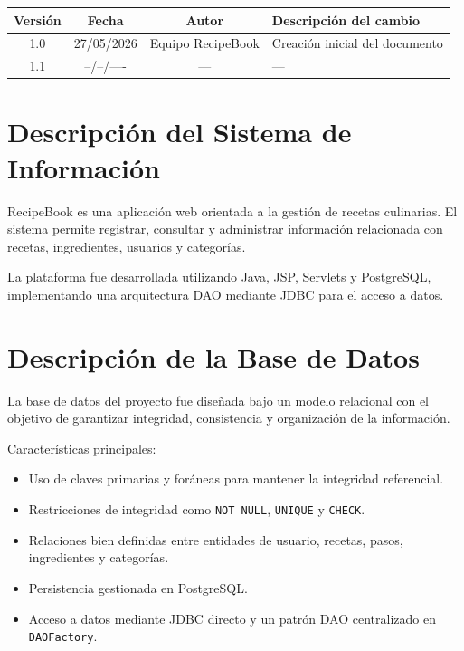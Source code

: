 \documentclass[12pt,a4paper]{article}
\begin{document}
\begin{table}[H]
\centering
\begin{tabular}{|c|c|c|p{6cm}|}
\hline
\textbf{Versión} & \textbf{Fecha} & \textbf{Autor} & \textbf{Descripción del cambio} \\
\hline
1.0 & 27/05/2026 & Equipo RecipeBook & Creación inicial del documento \\
\hline
1.1 & --/--/---- & --- & --- \\
\hline
\end{tabular}
\end{table}

\vspace{1cm}

\tableofcontents
\newpage

\section{Descripción del Sistema de Información}

RecipeBook es una aplicación web orientada a la gestión de recetas culinarias. El sistema permite registrar, consultar y administrar información relacionada con recetas, ingredientes, usuarios y categorías.

La plataforma fue desarrollada utilizando Java, JSP, Servlets y PostgreSQL, implementando una arquitectura DAO mediante JDBC para el acceso a datos.

\section{Descripción de la Base de Datos}

La base de datos del proyecto fue diseñada bajo un modelo relacional con el objetivo de garantizar integridad, consistencia y organización de la información.

Características principales:

\begin{itemize}
    \item Uso de claves primarias y foráneas para mantener la integridad referencial.
    \item Restricciones de integridad como \texttt{NOT NULL}, \texttt{UNIQUE} y \texttt{CHECK}.
    \item Relaciones bien definidas entre entidades de usuario, recetas, pasos, ingredientes y categorías.
    \item Persistencia gestionada en PostgreSQL.
    \item Acceso a datos mediante JDBC directo y un patrón DAO centralizado en \texttt{DAOFactory}.
\end{itemize}
\end{document}

